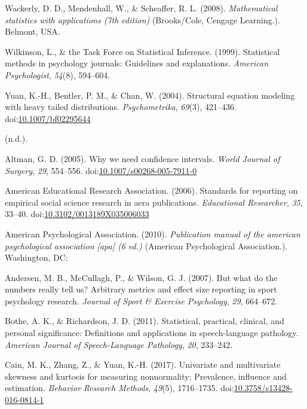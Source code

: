 \documentclass[
  man,floatsintext]{apa6}
\begin{document}
\leavevmode\hypertarget{ref-Wackerly_et_al_2008}{}%
Wackerly, D. D., Mendenhall, W., \& Scheaffer, R. L. (2008). \emph{Mathematical statistics with applications (7th edition)} (Brooks/Cole, Cengage Learning.). Belmont, USA.

\leavevmode\hypertarget{ref-Wilkinson_1999}{}%
Wilkinson, L., \& the Task Force on Statistical Inference. (1999). Statistical methods in psychology journals: Guidelines and explanations. \emph{American Psychologist}, \emph{54}(8), 594--604.

\leavevmode\hypertarget{ref-Yuan_et_al_2004}{}%
Yuan, K.-H., Bentler, P. M., \& Chan, W. (2004). Structural equation modeling with heavy tailed distributions. \emph{Psychometrika}, \emph{69}(3), 421--436. doi:\href{https://doi.org/10.1007/bf02295644}{10.1007/bf02295644}

\leavevmode\hypertarget{ref-Keselman_et_al_2008}{}%
(n.d.).

\leavevmode\hypertarget{ref-Altman_2005}{}%
Altman, G. D. (2005). Why we need confidence intervals. \emph{World Journal of Surgery}, \emph{29}, 554--556. doi:\href{https://doi.org/10.1007/s00268-005-7911-0}{10.1007/s00268-005-7911-0}

\leavevmode\hypertarget{ref-AERA_2006}{}%
American Educational Research Association. (2006). Standards for reporting on empirical social science research in aera publications. \emph{Educational Researcher}, \emph{35}, 33--40. doi:\href{https://doi.org/10.3102/0013189X035006033}{10.3102/0013189X035006033}

\leavevmode\hypertarget{ref-APA_2010}{}%
American Psychological Association. (2010). \emph{Publication manual of the american psychological association {[}apa{]} (6 ed.)} (American Psychological Association.). Washington, DC:

\leavevmode\hypertarget{ref-Andersen_et_al_2007}{}%
Andersen, M. B., McCullagh, P., \& Wilson, G. J. (2007). But what do the numbers really tell us? Arbitrary metrics and effect size reporting in sport psychology research. \emph{Journal of Sport \& Exercise Psychology}, \emph{29}, 664--672.

\leavevmode\hypertarget{ref-Bothe_Richardson_2011}{}%
Bothe, A. K., \& Richardson, J. D. (2011). Statistical, practical, clinical, and personal significance: Definitions and applications in speech-language pathology. \emph{American Journal of Speech-Language Pathology}, \emph{20}, 233--242.

\leavevmode\hypertarget{ref-Cain_et_al_2017}{}%
Cain, M. K., Zhang, Z., \& Yuan, K.-H. (2017). Univariate and multivariate skewness and kurtosis for measuring nonnormality: Prevalence, influence and estimation. \emph{Behavior Research Methods}, \emph{49}(5), 1716--1735. doi:\href{https://doi.org/10.3758/s13428-016-0814-1}{10.3758/s13428-016-0814-1}
\end{document}
